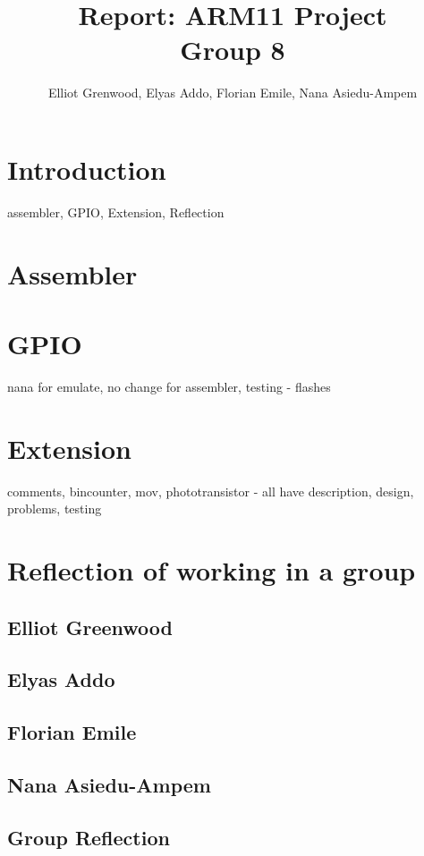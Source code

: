\documentclass[11pt]{article}
\begin{document}
\title{Report: ARM11 Project \\ Group 8}
\author{Elliot Grenwood, Elyas Addo, Florian Emile, Nana Asiedu-Ampem}

\maketitle

\section{Introduction}
assembler, GPIO, Extension, Reflection

\section{Assembler}

\section{GPIO}
nana for emulate, no change for assembler, testing - flashes

\section{Extension}
comments, bincounter, mov, phototransistor
  - all have description, design, problems, testing

\section{Reflection of working in a group}
\subsection{Elliot Greenwood}
\subsection{Elyas Addo}
\subsection{Florian Emile}
\subsection{Nana Asiedu-Ampem}
\subsection{Group Reflection}
\end{document}
